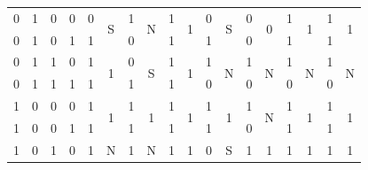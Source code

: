 \documentclass[11pt,UTF8]{ctexart}
\begin{document}
\begin{table}[H]
\begin{tabular}{|r|r|r|r|r|c|r|c|r|c|r|c|r|c|r|c|r|c|}
    \hline
    0     & 1     & 0     & 0     & 0     & \multirow{2}[4]{*}{S} & \textcolor[rgb]{ 1,  0,  0}{1} & \multirow{2}[4]{*}{N} & \textcolor[rgb]{ 1,  0,  0}{1} & \multirow{2}[4]{*}{1} & 0     & \multirow{2}[4]{*}{S} & 0     & \multirow{2}[4]{*}{0} & \textcolor[rgb]{ 1,  0,  0}{1} & \multirow{2}[4]{*}{1} & \textcolor[rgb]{ 1,  0,  0}{1} & \multirow{2}[4]{*}{1} \bigstrut\\
\cline{1-5}\cline{7-7}\cline{9-9}\cline{11-11}\cline{13-13}\cline{15-15}\cline{17-17}    0     & 1     & 0     & 1     & \textcolor[rgb]{ 1,  0,  0}{1} &       & 0     &       & \textcolor[rgb]{ 1,  0,  0}{1} &       & \textcolor[rgb]{ 1,  0,  0}{1} &       & 0     &       & \textcolor[rgb]{ 1,  0,  0}{1} &       & \textcolor[rgb]{ 1,  0,  0}{1} &  \bigstrut\\
    \hline
    0     & 1     & 1     & 0     & \textcolor[rgb]{ 1,  0,  0}{1} & \multirow{2}[4]{*}{1} & 0     & \multirow{2}[4]{*}{S} & \textcolor[rgb]{ 1,  0,  0}{1} & \multirow{2}[4]{*}{1} & \textcolor[rgb]{ 1,  0,  0}{1} & \multirow{2}[4]{*}{N} & \textcolor[rgb]{ 1,  0,  0}{1} & \multirow{2}[4]{*}{N} & \textcolor[rgb]{ 1,  0,  0}{1} & \multirow{2}[4]{*}{N} & \textcolor[rgb]{ 1,  0,  0}{1} & \multirow{2}[4]{*}{N} \bigstrut\\
\cline{1-5}\cline{7-7}\cline{9-9}\cline{11-11}\cline{13-13}\cline{15-15}\cline{17-17}    0     & 1     & 1     & 1     & \textcolor[rgb]{ 1,  0,  0}{1} &       & \textcolor[rgb]{ 1,  0,  0}{1} &       & \textcolor[rgb]{ 1,  0,  0}{1} &       & 0     &       & 0     &       & 0     &       & 0     &  \bigstrut\\
    \hline
    1     & 0     & 0     & 0     & \textcolor[rgb]{ 1,  0,  0}{1} & \multirow{2}[4]{*}{1} & \textcolor[rgb]{ 1,  0,  0}{1} & \multirow{2}[4]{*}{1} & \textcolor[rgb]{ 1,  0,  0}{1} & \multirow{2}[4]{*}{1} & \textcolor[rgb]{ 1,  0,  0}{1} & \multirow{2}[4]{*}{1} & \textcolor[rgb]{ 1,  0,  0}{1} & \multirow{2}[4]{*}{N} & \textcolor[rgb]{ 1,  0,  0}{1} & \multirow{2}[4]{*}{1} & \textcolor[rgb]{ 1,  0,  0}{1} & \multirow{2}[4]{*}{1} \bigstrut\\
\cline{1-5}\cline{7-7}\cline{9-9}\cline{11-11}\cline{13-13}\cline{15-15}\cline{17-17}    1     & 0     & 0     & 1     & \textcolor[rgb]{ 1,  0,  0}{1} &       & \textcolor[rgb]{ 1,  0,  0}{1} &       & \textcolor[rgb]{ 1,  0,  0}{1} &       & \textcolor[rgb]{ 1,  0,  0}{1} &       & 0     &       & \textcolor[rgb]{ 1,  0,  0}{1} &       & \textcolor[rgb]{ 1,  0,  0}{1} &  \bigstrut\\
    \hline
    1     & 0     & 1     & 0     & \textcolor[rgb]{ 1,  0,  0}{1} & \multirow{2}[4]{*}{N} & \textcolor[rgb]{ 1,  0,  0}{1} & \multirow{2}[4]{*}{N} & \textcolor[rgb]{ 1,  0,  0}{1} & \multirow{2}[4]{*}{1} & 0     & \multirow{2}[4]{*}{S} & \textcolor[rgb]{ 1,  0,  0}{1} & \multirow{2}[4]{*}{1} & \textcolor[rgb]{ 1,  0,  0}{1} & \multirow{2}[4]{*}{1} & \textcolor[rgb]{ 1,  0,  0}{1} & \multirow{2}[4]{*}{1} \bigstrut\\

\end{tabular}
\end{table}
\end{document}
